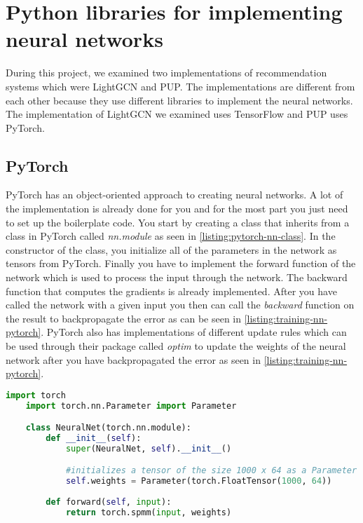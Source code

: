 \section{Python libraries for implementing neural networks}
During this project, we examined two implementations of recommendation systems which were LightGCN and PUP. 
The implementations are different from each other because they use different libraries to implement the neural networks.
The implementation of LightGCN we examined uses TensorFlow and PUP uses PyTorch.

\subsection{PyTorch}
PyTorch has an object-oriented approach to creating neural networks.
A lot of the implementation is already done for you and for the most part you just need to set up the boilerplate code.
You start by creating a class that inherits from a class in PyTorch called \textit{nn.module} as seen in \autoref{listing:pytorch-nn-class}.
In the constructor of the class, you initialize all of the parameters in the network as tensors from PyTorch.
Finally you have to implement the forward function of the network which is used to process the input through the network.
The backward function that computes the gradients is already implemented.
After you have called the network with a given input you then can call the \textit{backward} function on the result to backpropagate the error as can be seen in \autoref{listing:training-nn-pytorch}.
PyTorch also has implementations of different update rules which can be used through their package called \textit{optim} to update the weights of the neural network after you have backpropagated the error as seen in \autoref{listing:training-nn-pytorch}.

\begin{lstlisting}[language=Python, caption={Class implementing a neural network in PyTorch}, captionpos=b, label={listing:pytorch-nn-class}]
	import torch
	import torch.nn.Parameter import Parameter

	class NeuralNet(torch.nn.module):
		def __init__(self):
			super(NeuralNet, self).__init__()

			#initializes a tensor of the size 1000 x 64 as a Parameter in the neural network
			self.weights = Parameter(torch.FloatTensor(1000, 64))
		
		def forward(self, input):
			return torch.spmm(input, weights)

\end{lstlisting}

